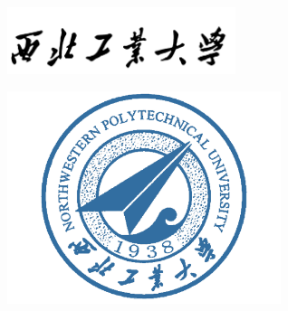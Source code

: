 \begin{titlepage}
    \centering
        \vspace*{6em}
        \includegraphics[width=0.5\textwidth]{pic/npu_2.png}\par
        \vspace{1em}
        \includegraphics[width=0.6\textwidth]{pic/npu_1.png}\par
    \vspace{1em}
        \begin{center}
            {\bfseries \Huge \thetitle}

            {\Huge \thesubtitle}
        \end{center}

        \vspace*{7em}
        
\end{titlepage}